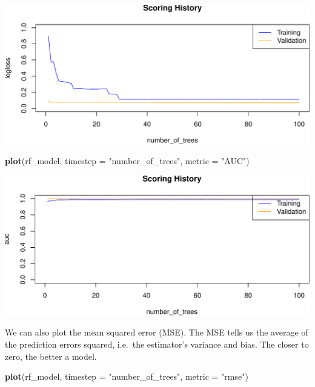 \documentclass[]{article}
\newenvironment{Shaded}{\begin{snugshade}}{\end{snugshade}}
\newcommand{\KeywordTok}[1]{\textcolor[rgb]{0.13,0.29,0.53}{\textbf{{#1}}}}
\newcommand{\DataTypeTok}[1]{\textcolor[rgb]{0.13,0.29,0.53}{{#1}}}
\newcommand{\StringTok}[1]{\textcolor[rgb]{0.31,0.60,0.02}{{#1}}}
\newcommand{\NormalTok}[1]{{#1}}
\begin{document}
\begin{center}\includegraphics{webinar_code_files/figure-latex/unnamed-chunk-45-1} \end{center}

\begin{Shaded}
\begin{Highlighting}[]
\KeywordTok{plot}\NormalTok{(rf_model,}
     \DataTypeTok{timestep =} \StringTok{"number_of_trees"}\NormalTok{,}
     \DataTypeTok{metric =} \StringTok{"AUC"}\NormalTok{)}
\end{Highlighting}
\end{Shaded}

\begin{center}\includegraphics{webinar_code_files/figure-latex/unnamed-chunk-46-1} \end{center}

We can also plot the mean squared error (MSE). The MSE tells us the
average of the prediction errors squared, i.e.~the estimator's variance
and bias. The closer to zero, the better a model.

\begin{Shaded}
\begin{Highlighting}[]
\KeywordTok{plot}\NormalTok{(rf_model,}
     \DataTypeTok{timestep =} \StringTok{"number_of_trees"}\NormalTok{,}
     \DataTypeTok{metric =} \StringTok{"rmse"}\NormalTok{)}
\end{Highlighting}
\end{Shaded}
\end{document}
